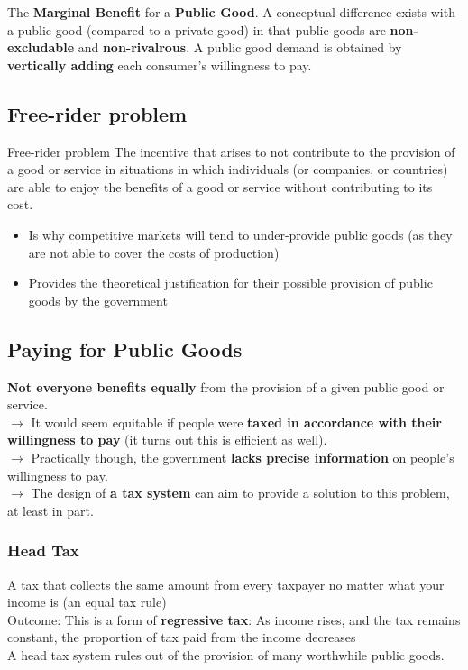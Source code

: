 \noindent The \textbf{Marginal Benefit} for a \textbf{Public Good}. A conceptual difference exists with a public good (compared to a private good) in that public goods are \textbf{non-excludable} and \textbf{non-rivalrous}. A public good demand is obtained by \textbf{vertically adding} each consumer's willingness to pay.

\subsection{Free-rider problem}
\begin{note}{Free-rider problem}
	The incentive that arises to not contribute to the provision of a good or service in situations in which individuals (or companies, or countries) are able to enjoy the benefits of a good or service without contributing to its cost.
\end{note}
\begin{itemize}
	\item Is why competitive markets will tend to under-provide public goods (as they are not able to cover the costs of production)
	\item Provides the theoretical justification for their possible provision of public goods by the government
\end{itemize}

\subsection{Paying for Public Goods}
\textbf{Not everyone benefits equally} from the provision of a given public good or service.\\
$\rightarrow$ It would seem equitable if people were \textbf{taxed in accordance with their willingness to pay} (it turns out this is efficient as well).\\
$\rightarrow$ Practically though, the government \textbf{lacks precise information} on people's willingness to pay.\\
$\rightarrow$ The design of \textbf{a tax system} can aim to provide a solution to this problem, at least in part.

\subsubsection{Head Tax}
A tax that collects the same amount from every taxpayer no matter what your income is (an equal tax rule)\\
Outcome: This is a form of \textbf{regressive tax}: As income rises, and the tax remains constant, the proportion of tax paid from the income decreases\\
A head tax system rules out of the provision of many worthwhile public goods.

